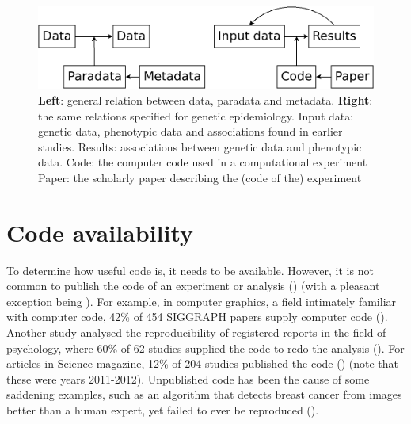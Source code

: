 \begin{figure}[!htbp]
  \centering
  \includegraphics[width=\linewidth]{figure_1.png}
  \caption{
    \textbf{Left}: general relation between data, paradata and metadata.
    \textbf{Right}: the same relations specified for genetic epidemiology.
    Input data: genetic data, phenotypic data and associations
    found in earlier studies.
    Results: associations between genetic data and phenotypic data.
    Code: the computer code used in a computational experiment
    Paper: the scholarly paper describing the (code of the) experiment
  }
  \label{fig:figure_1}
\end{figure}

\section{Code availability}\label{sec:code-availability}

To determine how useful code is, it needs to be available.
However, it is not common to publish the code of an experiment or analysis 
(\cite{stodden2011trust,read2015sizing}) (with a pleasant exception 
being \cite{conesa2019making}).
For example, in computer graphics, 
a field intimately familiar with computer code,
42\% of 454 SIGGRAPH papers supply computer code (\cite{bonneel2020code}).
Another study analysed the reproducibility of registered reports
in the field of psychology, 
where 60\% of 62 studies supplied the code 
to redo the analysis (\cite{obels2020analysis}).
For articles in Science magazine, 12\% of 204
studies published the code (\cite{stodden2018empirical}) 
(note that these were years 2011-2012).
Unpublished code has been the cause of some saddening examples,
such as an algorithm that detects breast cancer from images 
better than a human expert, 
yet failed to ever be reproduced (\cite{haibe2020importance}).


